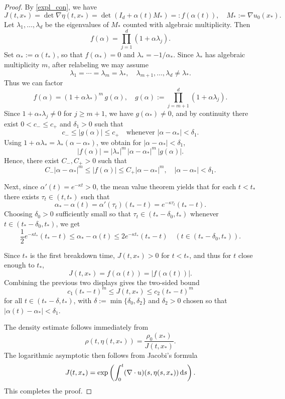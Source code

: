 \documentclass[11pt]{amsart}
\numberwithin{equation}{section}
\theoremstyle{definition}
\theoremstyle{remark}
\numberwithin{equation}{section}
\newcommand{\lt}{\left}
\newcommand{\rt}{\right}
\newcommand{\ds}{\textnormal{d}s}
\renewcommand{\ge}{\geqslant}
\renewcommand{\le}{\leqslant}
\begin{document}
\begin{proof}
By \eqref{expl_con}, we have
\[
J(t,x_*)=\det\nabla\eta(t,x_*)=\det(I_d+\alpha(t)M_*)=:f(\alpha(t)), \quad M_*:=\nabla u_0(x_*).
\]
Let $\lambda_1,\dots,\lambda_d$ be the eigenvalues of $M_*$ counted with algebraic multiplicity.
Then
\[
f(\alpha)=\prod_{j=1}^d(1+\alpha\lambda_j).
\]
Set $\alpha_*:=\alpha(t_*)$, so that $f(\alpha_*)=0$ and $\lambda_*=-1/\alpha_*$.
Since $\lambda_*$ has algebraic multiplicity $m$, after relabeling we may assume
\[
\lambda_1=\cdots=\lambda_m=\lambda_*,
\quad
\lambda_{m+1},\dots,\lambda_d\neq \lambda_*.
\]
Thus we can factor
\[
f(\alpha)=(1+\alpha\lambda_*)^m\,g(\alpha),
\quad
g(\alpha):=\prod_{j=m+1}^d(1+\alpha\lambda_j).
\]
Since $1+\alpha_*\lambda_j\neq0$ for $j\ge m+1$, we have $g(\alpha_*)\neq0$, and by continuity there exist
$0<c_-\le c_+$ and $\delta_1>0$ such that
\[
c_-\le |g(\alpha)|\le c_+ \quad \text{whenever }|\alpha-\alpha_*|<\delta_1.
\]
Using $1+\alpha\lambda_*=\lambda_*(\alpha-\alpha_*)$, we obtain for $|\alpha-\alpha_*|<\delta_1$,
\[
|f(\alpha)|=|\lambda_*|^m\,|\alpha-\alpha_*|^m\,|g(\alpha)|.
\]
Hence, there exist $C_-,C_+>0$ such that
\[
C_-|\alpha-\alpha_*|^m\le |f(\alpha)|\le C_+|\alpha-\alpha_*|^m,
\quad |\alpha-\alpha_*|<\delta_1.
\]

Next, since $\alpha'(t)=e^{-\kappa t}>0$, the mean value theorem yields that for each $t<t_*$ there exists $\tau_t\in(t,t_*)$ such that
\[
\alpha_*-\alpha(t)=\alpha'(\tau_t)(t_*-t)=e^{-\kappa\tau_t}(t_*-t).
\]
Choosing $\delta_0>0$ sufficiently small so that $\tau_t\in(t_*-\delta_0,t_*)$ whenever $t\in(t_*-\delta_0,t_*)$, we get
\[
\frac12 e^{-\kappa t_*}(t_*-t)\le \alpha_*-\alpha(t)\le 2 e^{-\kappa t_*}(t_*-t)
\quad (t\in(t_*-\delta_0,t_*)).
\]

Since $t_*$ is the first breakdown time, $J(t,x_*)>0$ for $t<t_*$, and thus for $t$ close enough to $t_*$,
\[
J(t,x_*)=f(\alpha(t))=|f(\alpha(t))|.
\]
Combining the previous two displays gives the two-sided bound
\[
c_1 (t_*-t)^m \le J(t,x_*) \le c_2 (t_*-t)^m
\]
for all $t\in(t_*-\delta,t_*)$, with $\delta:=\min\{\delta_0,\delta_2\}$ and $\delta_2>0$ chosen so that
$|\alpha(t)-\alpha_*|<\delta_1$.

The density estimate follows immediately from
\[
\rho(t,\eta(t,x_*))=\frac{\rho_0(x_*)}{J(t,x_*)}.
\]
The logarithmic asymptotic then follows from Jacobi's formula
\[
J(t,x_*)=\exp\lt(\int_0^t (\nabla\cdot u)(s,\eta(s,x_*))\,\ds\rt).
\]
This completes the proof.
\end{proof}
\end{document}
